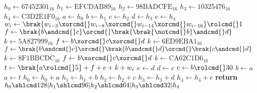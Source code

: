 \begin{algorithmic}[1]
\State $h_0\gets\textrm{67452301}_{16}$
\State $h_1\gets\textrm{EFCDAB89}_{16}$
\State $h_2\gets\textrm{98BADCFE}_{16}$
\State $h_3\gets\textrm{10325476}_{16}$
\State $h_4\gets\textrm{C3D2E1F0}_{16}$
\State $a\gets h_0$
\State $b\gets h_1$
\State $c\gets h_2$
\State $d\gets h_3$
\State $e\gets h_4$
\State $w_i\gets\brak{w_{i-3}\xorcmd{}w_{i-8}\xorcmd{}w_{i-14}\xorcmd{}w_{i-16}}\rolcmd{}1$
\EndFor
{}
\State $f\gets \brak{b\andcmd{}c}\orcmd{}\brak{\brak{\notcmd{}b}\andcmd{}d}$
\State $k\gets\textrm{5A827999}_{16}$
\State $f\gets b\xorcmd{}c\xorcmd{}d$
\State $k\gets\textrm{6ED9EBA1}_{16}$
\State $f\gets \brak{b\andcmd{}c}\orcmd{}\brak{b\andcmd{}d}\orcmd{}\brak{c\andcmd{}d}$
\State $k\gets\textrm{8F1BBCDC}_{16}$
\State $f\gets b\xorcmd{}c\xorcmd{}d$
\State $k\gets\textrm{CA62C1D6}_{16}$
\EndIf
\State $t\gets \brak{a\rolcmd{}5}+f+e+k+w_i$
\State $e\gets d$
\State $d\gets c$
\State $c\gets b\rolcmd{}30$
\State $b\gets a$
\State $a\gets t$
\EndFor
\State $h_0\gets h_0+a$
\State $h_1\gets h_1+b$
\State $h_2\gets h_2+c$
\State $h_3\gets h_3+d$
\State $h_4\gets h_4+e$
\EndFor
\State \textbf{return} $h_0\shlcmd128|h_1\shlcmd96|h_2\shlcmd64|h_3\shlcmd32|h_4$
\EndProcedure
\end{algorithmic}
